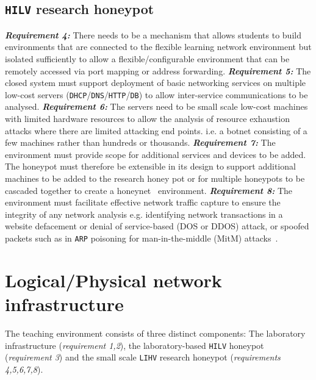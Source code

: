 \subsection{\texttt{HILV} research honeypot}\label{subsec:ResearchHoneypot}
\noindent \emph{\textbf{Requirement 4:}} There needs to be a mechanism that allows students to build environments that are connected to the flexible learning network environment but isolated sufficiently to allow a flexible/configurable environment that can be remotely accessed via port mapping or address forwarding. 
\newline\newline
\noindent \emph{\textbf{Requirement 5:}} The closed system must support deployment of basic networking services on multiple low-cost servers (\texttt{DHCP}/\texttt{DNS}/\texttt{HTTP}/\texttt{DB}) to allow inter-service communications to be analysed. 
\newline\newline
\noindent \emph{\textbf{Requirement 6:}} The servers need to be small scale low-cost machines with limited hardware resources to allow the analysis of resource exhaustion attacks where there are limited attacking end points. i.e. a botnet consisting of a few machines rather than hundreds or thousands. 
\newline\newline
\noindent \emph{\textbf{Requirement 7:}} The environment must provide scope for additional services and devices to be added. The honeypot must therefore be extensible in its design to support additional machines to be added to the research honey pot or for multiple honeypots to be cascaded together to create a honeynet~\cite{AA:15,FDF:15,KNC:15} environment.
\newline\newline
\noindent \emph{\textbf{Requirement 8:}} The environment must facilitate effective network traffic capture to ensure the integrity of any network analysis e.g. identifying network transactions in a website defacement or denial of service-based (DOS or DDOS) attack, or spoofed packets such as in \texttt{ARP} poisoning for man-in-the-middle (MitM) attacks~\cite{PS:16,RSKA:16}.  

\section{Logical/Physical network infrastructure}\label{LogicalDesign}

The teaching environment consists of three distinct components: The laboratory infrastructure (\textit{requirement 1,2}), the laboratory-based \texttt{HILV} honeypot (\textit{requirement 3}) and the small scale \texttt{LIHV} research honeypot (\textit{requirements 4,5,6,7,8}). 

